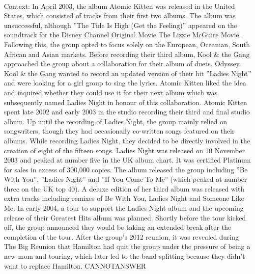 \documentclass[11pt,a4paper, onecolumn]{article}
\begin{document}
\\ Context: In April 2003, the album Atomic Kitten was released in the United States, which consisted of tracks from their first two albums. The album was unsuccessful, although ''The Tide Is High (Get the Feeling)'' appeared on the soundtrack for the Disney Channel Original Movie The Lizzie McGuire Movie. Following this, the group opted to focus solely on the European, Oceanian, South African and Asian markets. Before recording their third album, Kool & the Gang approached the group about a collaboration for their album of duets, Odyssey. Kool & the Gang wanted to record an updated version of their hit ''Ladies Night'' and were looking for a girl group to sing the lyrics. Atomic Kitten liked the idea and inquired whether they could use it for their next album which was subsequently named Ladies Night in honour of this collaboration. Atomic Kitten spent late 2002 and early 2003 in the studio recording their third and final studio album. Up until the recording of Ladies Night, the group mainly relied on songwriters, though they had occasionally co-written songs featured on their albums. While recording Ladies Night, they decided to be directly involved in the creation of eight of the fifteen songs. Ladies Night was released on 10 November 2003 and peaked at number five in the UK album chart. It was certified Platinum for sales in excess of 300,000 copies. The album released the group including ''Be With You'', ''Ladies Night'' and ''If You Come To Me'' (which peaked at number three on the UK top 40). A deluxe edition of her third album was released with extra tracks including remixes of Be With You, Ladies Night and Someone Like Me. In early 2004, a tour to support the Ladies Night album and the upcoming release of their Greatest Hits album was planned. Shortly before the tour kicked off, the group announced they would be taking an extended break after the completion of the tour. After the group's 2012 reunion, it was revealed during The Big Reunion that Hamilton had quit the group under the pressure of being a new mom and touring, which later led to the band splitting because they didn't want to replace Hamilton. CANNOTANSWER
\end{document}

